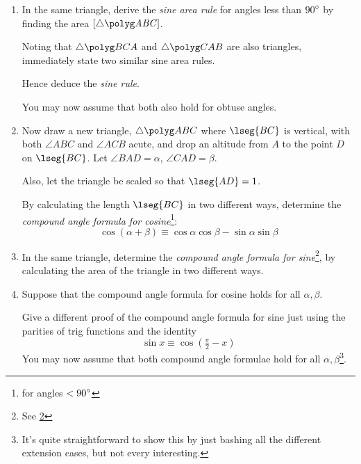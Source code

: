\begin{enumerate}
  Label the sides in the conventional way:
  \(\lseg{AB} = c\), \(\lseg{BC} = a\), \(\lseg{CA} = b\).

  Drop an altitude\footnote{
   This is a word for the perpendicular to a side of a triangle the passes
   through the opposite vertex.
  } from \(B\) to the point \(D\) on \(\lseg{AC}\).

  Derive the \emph{cosine rule} for angles less than \(\degrees{90}\) by
  finding the length \(\lseg{BC}\).

  You may now assume that this also holds for \(\theta\) obtuse.
 \item
  In the same triangle, derive the \emph{sine area rule} for angles less than
  \(\degrees{90}\) by finding the area \(\area{\tri{ABC}}\).

  Noting that \(\tri{BCA}\) and \(\tri{CAB}\) are also triangles, immediately
  state two similar sine area rules.

  Hence deduce the \emph{sine rule}.

  You may now assume that both also hold for obtuse angles.
 \item
  Now draw a new triangle, \(\tri{ABC}\) where \(\lseg{BC}\) is vertical, with
  both \(\angle{ABC}\) and \(\angle{ACB}\) acute, and drop an altitude from
  \(A\) to the point \(D\) on \(\lseg{BC}\). Let \(\angle{BAD} = \alpha\),
  \(\angle{CAD} = \beta\).

  Also, let the triangle be scaled so that \(\lseg{AD} = 1\).

  By calculating the length \(\lseg{BC}\) in two different ways, determine the
  \emph{compound angle formula for cosine}\footnote{
   \label{foot_compound_angles}%
   for angles \(< {90}^\circ\)
  }:
  \begin{equation*}
   \cos(\alpha + \beta) \equiv \cos \alpha \cos \beta - \sin \alpha \sin \beta
  \end{equation*}
 \item
  In the same triangle, determine the
  \emph{compound angle formula for
  sine}\footnote{
   See \ref{foot_compound_angles}
  }, by calculating the area of the triangle in two different ways.
 \item
  Suppose that the compound angle formula for cosine holds for all
  \(\alpha, \beta\).

  Give a different proof of the compound angle formula for sine just using the
  parities of trig functions and the identity
  \begin{equation*}
   \sin x \equiv \cos(\tfrac \pi 2 - x)
  \end{equation*}
  You may now assume that both compound angle formulae hold for all
  \(\alpha, \beta\)\footnote{
   It's quite straightforward to show this by just bashing all the different
   extension cases, but not every interesting.}.


\end{enumerate}
